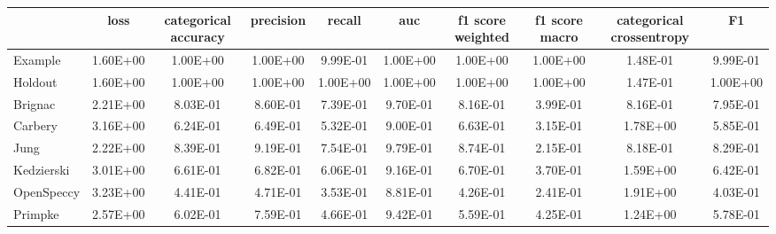 \begin{tabular}{lccccccccc}
\toprule
 & loss & categorical accuracy & precision & recall & auc & f1 score weighted & f1 score macro & categorical crossentropy & F1 \\
\midrule
Example & 1.60E+00 & 1.00E+00 & 1.00E+00 & 9.99E-01 & 1.00E+00 & 1.00E+00 & 1.00E+00 & 1.48E-01 & 9.99E-01 \\
Holdout & 1.60E+00 & 1.00E+00 & 1.00E+00 & 1.00E+00 & 1.00E+00 & 1.00E+00 & 1.00E+00 & 1.47E-01 & 1.00E+00 \\
Brignac & 2.21E+00 & 8.03E-01 & 8.60E-01 & 7.39E-01 & 9.70E-01 & 8.16E-01 & 3.99E-01 & 8.16E-01 & 7.95E-01 \\
Carbery & 3.16E+00 & 6.24E-01 & 6.49E-01 & 5.32E-01 & 9.00E-01 & 6.63E-01 & 3.15E-01 & 1.78E+00 & 5.85E-01 \\
Jung & 2.22E+00 & 8.39E-01 & 9.19E-01 & 7.54E-01 & 9.79E-01 & 8.74E-01 & 2.15E-01 & 8.18E-01 & 8.29E-01 \\
Kedzierski & 3.01E+00 & 6.61E-01 & 6.82E-01 & 6.06E-01 & 9.16E-01 & 6.70E-01 & 3.70E-01 & 1.59E+00 & 6.42E-01 \\
OpenSpeccy & 3.23E+00 & 4.41E-01 & 4.71E-01 & 3.53E-01 & 8.81E-01 & 4.26E-01 & 2.41E-01 & 1.91E+00 & 4.03E-01 \\
Primpke & 2.57E+00 & 6.02E-01 & 7.59E-01 & 4.66E-01 & 9.42E-01 & 5.59E-01 & 4.25E-01 & 1.24E+00 & 5.78E-01 \\
\bottomrule
\end{tabular}
